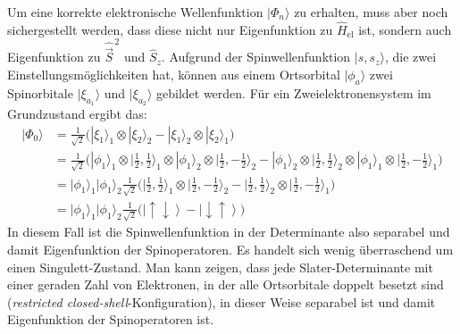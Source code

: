 \documentclass[9pt]{report}
\begin{document}
Um eine korrekte elektronische Wellenfunktion $|\Phi_n\rangle$ zu erhalten, muss aber noch sichergestellt werden, dass diese nicht nur Eigenfunktion zu $\hat{H}_{\mathrm{el}}$ ist, sondern auch Eigenfunktion zu $\hat{\vec{S}}^{\,2}$ und $\hat{S}_z$. Aufgrund der Spinwellenfunktion $|s,s_z\rangle$, die zwei Einstellungsmöglichkeiten hat, können aus einem Ortsorbital $|\phi_a\rangle$ zwei Spinorbitale $|\xi_{a_1}\rangle$ und $|\xi_{a_2}\rangle$ gebildet werden. Für ein Zweielektronensystem im Grundzustand ergibt das:
\begin{align}
|\Phi_0\rangle &= \frac{1}{\sqrt{2}}\Big(|\xi_1\rangle_1\otimes|\xi_2\rangle_2 - |\xi_1\rangle_2\otimes|\xi_2\rangle_1\Big)\\
&= \frac{1}{\sqrt{2}}\Big(|\phi_1\rangle_1\otimes\big|\tfrac{1}{2},\tfrac{1}{2}\big\rangle_1\otimes|\phi_1\rangle_2\otimes\big|\tfrac{1}{2},-\tfrac{1}{2}\big\rangle_2 - |\phi_1\rangle_2\otimes\big|\tfrac{1}{2},\tfrac{1}{2}\big\rangle_2\otimes|\phi_1\rangle_1\otimes\big|\tfrac{1}{2},-\tfrac{1}{2}\big\rangle_1\Big)\\
&= \big|\phi_1\big\rangle_1\big|\phi_1\big\rangle_2\frac{1}{\sqrt{2}}\Big(\big|\tfrac{1}{2},\tfrac{1}{2}\big\rangle_1\otimes\big|\tfrac{1}{2},-\tfrac{1}{2}\big\rangle_2 - \big|\tfrac{1}{2},\tfrac{1}{2}\big\rangle_2\otimes\big|\tfrac{1}{2},-\tfrac{1}{2}\big\rangle_1\Big)\\
&= \big|\phi_1\big\rangle_1\big|\phi_1\big\rangle_2\frac{1}{\sqrt{2}}\big(\left|\uparrow\downarrow\right\rangle - \left|\downarrow\uparrow\right\rangle\big)
\end{align}
In diesem Fall ist die Spinwellenfunktion in der Determinante also separabel und damit Eigenfunktion der Spinoperatoren. Es handelt sich wenig überraschend um einen Singulett-Zustand. Man kann zeigen, dass jede Slater-Determinante mit einer geraden Zahl von Elektronen, in der alle Ortsorbitale doppelt besetzt sind (\textit{restricted closed-shell}-Konfiguration), in dieser Weise separabel ist und damit Eigenfunktion der Spinoperatoren ist.
\end{document}
